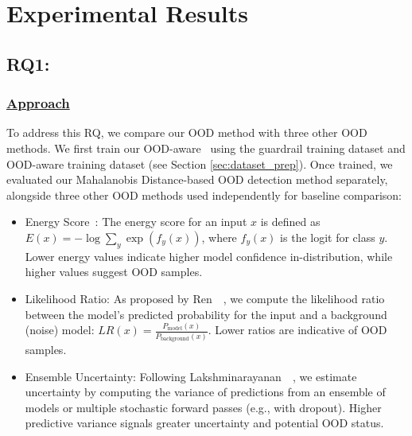 \section{Experimental Results}
\label{sec:exp_results}

\subsection{RQ1: \rqone}
% 
\subsubsection*{\underline{\textbf{Approach}}}
To address this RQ, we compare our OOD method with three other OOD methods.
We first train our OOD-aware \ourapp~using the guardrail training dataset and OOD-aware training dataset (see Section \ref{sec:dataset_prep}).
Once trained, we evaluated our Mahalanobis Distance-based OOD detection method separately, alongside three other OOD methods used independently for baseline comparison:
\begin{itemize}
    \item Energy Score~\cite{liu2020energy}: The energy score for an input $x$ is defined as $E(x) = -\log \sum_{y} \exp(f_y(x))$, where $f_y(x)$ is the logit for class $y$. Lower energy values indicate higher model confidence in-distribution, while higher values suggest OOD samples.
    \item Likelihood Ratio: As proposed by Ren~\ea~\cite{ren2019likelihood}, we compute the likelihood ratio between the model's predicted probability for the input and a background (noise) model: $LR(x) = \frac{P_{\text{model}}(x)}{P_{\text{background}}(x)}$. Lower ratios are indicative of OOD samples.
    \item Ensemble Uncertainty: Following Lakshminarayanan~\ea~\cite{lakshminarayanan2017simple}, we estimate uncertainty by computing the variance of predictions from an ensemble of models or multiple stochastic forward passes (e.g., with dropout). Higher predictive variance signals greater uncertainty and potential OOD status.
\end{itemize}
